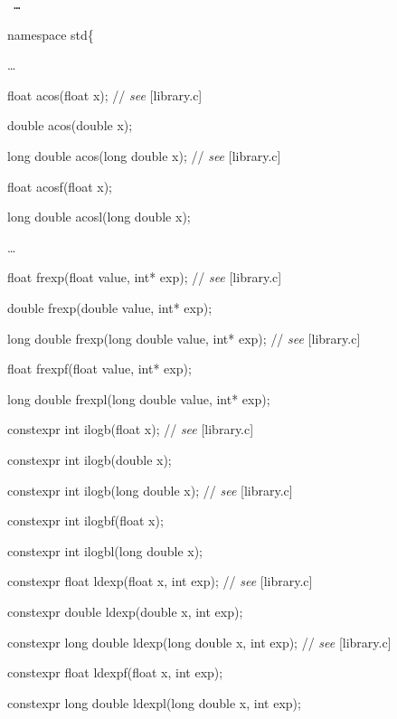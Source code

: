 \documentclass[prd,twocolumn,amsmath,amssymb,nofootinbib,eqsecnum]{revtex4-1}
\newcommand{\code}[1]{{\tt #1}}
\newcommand{\highlight}[1]{{\color{red} #1}}
\newcommand{\stdcomment}[1]{{// {\em see} [#1]}}
\begin{document}
\code{
\ldots
\vspace{2ex}

namespace std\{

\vspace{2ex}
\ldots
\vspace{2ex}

float acos(float x); \stdcomment{library.c}

double acos(double x);

long double acos(long double x); \stdcomment{library.c}

float acosf(float x);

long double acosl(long double x);

\vspace{2ex}
\ldots
\vspace{2ex}

float frexp(float value, int* exp); \stdcomment{library.c}

double frexp(double value, int* exp);

long double frexp(long double value, int* exp); \stdcomment{library.c}

float frexpf(float value, int* exp);

long double frexpl(long double value, int* exp);

\vspace{2ex}

\highlight{constexpr} int ilogb(float x); \stdcomment{library.c}

\highlight{constexpr} int ilogb(double x);

\highlight{constexpr} int ilogb(long double x); \stdcomment{library.c}

\highlight{constexpr} int ilogbf(float x);

\highlight{constexpr} int ilogbl(long double x);

\vspace{2ex}

\highlight{constexpr} float ldexp(float x, int exp); \stdcomment{library.c}

\highlight{constexpr} double ldexp(double x, int exp);

\highlight{constexpr} long double ldexp(long double x, int exp); \stdcomment{library.c}

\highlight{constexpr} float ldexpf(float x, int exp);

\highlight{constexpr} long double ldexpl(long double x, int exp);

\vspace{2ex}

}
\end{document}
